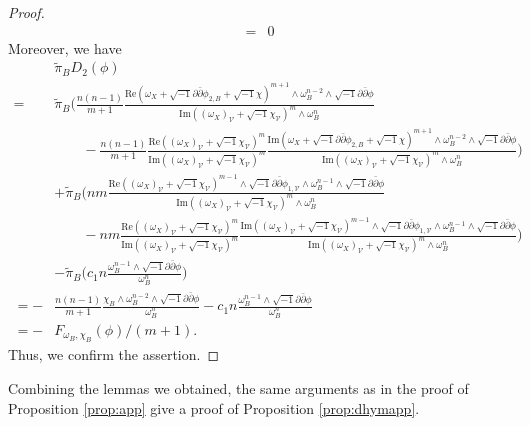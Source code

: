 \documentclass{amsart}
\numberwithin{equation}{section}
\theoremstyle{plain}
\theoremstyle{definition}
\theoremstyle{remark}
\begin{document}
\begin{proof}
\begin{align*}
        =&0
    \end{align*}
    Moreover, we have
    \begin{align*}
        &\tilde{\pi}_BD_2(\phi)\\
        =&\tilde{\pi}_B\Biggl(\frac{n(n-1)}{m+1}\frac{\mathrm{Re}(\omega_X+\sqrt{-1}\partial\bar{\partial}\phi_{2,B}+\sqrt{-1}\chi)^{m+1}\wedge\omega_B^{n-2}\wedge\sqrt{-1}\partial\bar{\partial}\phi}{\mathrm{Im}((\omega_X)_\mathcal{V}+\sqrt{-1}\chi_\mathcal{V})^m\wedge\omega_B^n}\\
        &\qquad-\frac{n(n-1)}{m+1}\frac{\mathrm{Re}((\omega_X)_\mathcal{V}+\sqrt{-1}\chi_\mathcal{V})^m}{\mathrm{Im}((\omega_X)_\mathcal{V}+\sqrt{-1}\chi_\mathcal{V})^m}\frac{\mathrm{Im}(\omega_X+\sqrt{-1}\partial\bar{
        \partial}\phi_{2,B}+\sqrt{-1}\chi)^{m+1}\wedge\omega_B^{n-2}\wedge\sqrt{-1}\partial\bar{\partial}\phi}{\mathrm{Im}((\omega_X)_\mathcal{V}+\sqrt{-1}\chi_\mathcal{V})^m\wedge\omega_B^n}\Biggr)\\
        &+\tilde{\pi}_B\Biggl(nm\frac{\mathrm{Re}((\omega_X)_\mathcal{V}+\sqrt{-1}\chi_\mathcal{V})^{m-1}\wedge\sqrt{-1}\partial\bar{\partial}\phi_{1,\mathcal{V}}\wedge\omega_B^{n-1}\wedge\sqrt{-1}\partial\bar{\partial}\phi}{\mathrm{Im}((\omega_X)_\mathcal{V}+\sqrt{-1}\chi_\mathcal{V})^m\wedge\omega_B^n}\\
        &\qquad-nm\frac{\mathrm{Re}((\omega_X)_\mathcal{V}+\sqrt{-1}\chi_\mathcal{V})^m}{\mathrm{Im}((\omega_X)_\mathcal{V}+\sqrt{-1}\chi_\mathcal{V})^m}\frac{\mathrm{Im}((\omega_X)_\mathcal{V}+\sqrt{-1}\chi_\mathcal{V})^{m-1}\wedge
        \sqrt{-1}\partial\bar{\partial}\phi_{1,\mathcal{V}}\wedge\omega_B^{n-1}\wedge\sqrt{-1}\partial\bar{\partial}\phi}{\mathrm{Im}((\omega_X)_\mathcal{V}+\sqrt{-1}\chi_\mathcal{V})^m\wedge\omega_B^n}\Biggr)\\
        &-\tilde{\pi}_B\Biggl(c_1n\frac{\omega_B^{n-1}\wedge\sqrt{-1}\partial\bar{\partial}\phi}{\omega_B^n}\Biggr)\\
        =-&\frac{n(n-1)}{m+1}\frac{\chi_B\wedge\omega_B^{n-2}\wedge\sqrt{-1}\partial\bar{\partial}\phi}{\omega_B^n}-c_1n\frac{\omega_B^{n-1}\wedge\sqrt{-1}\partial\bar{\partial}\phi}{\omega_B^n}\\
        =-&F_{\omega_B,\chi_B}(\phi)/(m+1).
    \end{align*}
    Thus, we confirm the assertion.
\end{proof}

Combining the lemmas we obtained, the same arguments as in the proof of Proposition \ref{prop:app} give a proof of Proposition \ref{prop:dhymapp}.
\end{document}
